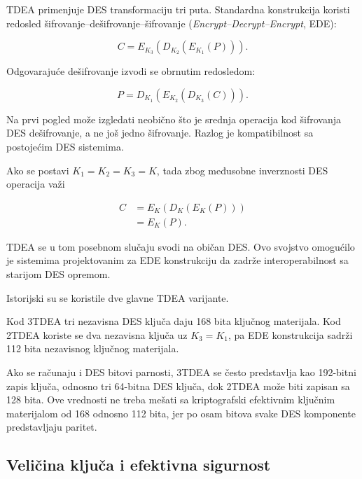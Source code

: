TDEA primenjuje DES transformaciju tri puta. Standardna konstrukcija
koristi redosled šifrovanje--dešifrovanje--šifrovanje
(\emph{Encrypt--Decrypt--Encrypt}, EDE):

\begin{equation}
    C =
    E_{K_3}
    \left(
        D_{K_2}
        \left(
            E_{K_1}(P)
        \right)
    \right).
    \label{eq:tdea-ede}
\end{equation}

Odgovarajuće dešifrovanje izvodi se obrnutim redosledom:

\begin{equation}
    P =
    D_{K_1}
    \left(
        E_{K_2}
        \left(
            D_{K_3}(C)
        \right)
    \right).
    \label{eq:tdea-ded}
\end{equation}

Na prvi pogled može izgledati neobično što je srednja operacija kod
šifrovanja DES dešifrovanje, a ne još jedno šifrovanje. Razlog je
kompatibilnost sa postojećim DES sistemima.

Ako se postavi
$K_1 = K_2 = K_3 = K$,
tada zbog međusobne inverznosti DES operacija važi

\begin{align}
    C
    &=
    E_K\left(D_K\left(E_K(P)\right)\right)\\
    &=
    E_K(P).
\end{align}

TDEA se u tom posebnom slučaju svodi na običan DES. Ovo svojstvo
omogućilo je sistemima projektovanim za EDE konstrukciju da zadrže
interoperabilnost sa starijom DES opremom.

Istorijski su se koristile dve glavne TDEA varijante.

Kod 3TDEA tri nezavisna DES ključa daju 168 bita ključnog materijala.
Kod 2TDEA koriste se dva nezavisna ključa uz $K_3=K_1$, pa EDE
konstrukcija sadrži 112 bita nezavisnog ključnog materijala.

Ako se računaju i DES bitovi parnosti, 3TDEA se često predstavlja
kao 192-bitni zapis ključa, odnosno tri 64-bitna DES ključa, dok 2TDEA
može biti zapisan sa 128 bita. Ove vrednosti ne treba mešati sa
kriptografski efektivnim ključnim materijalom od 168 odnosno 112 bita,
jer po osam bitova svake DES komponente predstavljaju paritet.


\subsection{Veličina ključa i efektivna sigurnost}
\label{subsec:tdea_security_strength}

